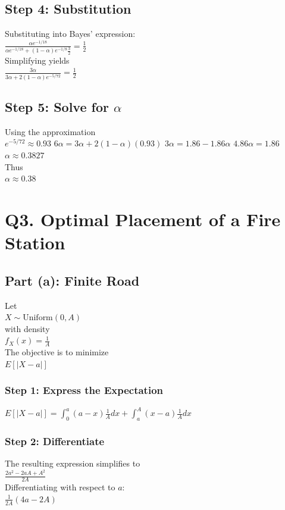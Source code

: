 \documentclass{article}
\begin{document}
\subsection{Step 4: Substitution}
Substituting into Bayes' expression: \\
$\frac{\alpha e^{-1/18}}{\alpha e^{-1/18}+(1-\alpha)e^{-1/8}\frac{3}{2}}=\frac{1}{2}$ \\
Simplifying yields \\
$\frac{3\alpha}{3\alpha+2(1-\alpha)e^{-5/72}}=\frac{1}{2}$

\subsection{Step 5: Solve for $\alpha$}
Using the approximation \\
$e^{-5/72} \approx 0.93$ \quad $6\alpha = 3\alpha + 2(1-\alpha)(0.93)$ \quad $3\alpha = 1.86 - 1.86\alpha$ \quad $4.86\alpha = 1.86$ \quad $\alpha \approx 0.3827$ \\
Thus \\
$\alpha \approx 0.38$

\section{Q3. Optimal Placement of a Fire Station}

\subsection{Part (a): Finite Road}
Let \\
$X \sim \text{Uniform}(0,A)$ \\
with density \\
$f_X(x)=\frac{1}{A}$ \\
The objective is to minimize \\
$E[|X-a|]$

\subsubsection{Step 1: Express the Expectation}
$E[|X-a|] = \int_0^a (a-x)\frac{1}{A}dx + \int_a^A (x-a)\frac{1}{A}dx$

\subsubsection{Step 2: Differentiate}
The resulting expression simplifies to \\
$\frac{2a^2 - 2aA + A^2}{2A}$ \\
Differentiating with respect to $a$: \\
$\frac{1}{2A}(4a-2A)$
\end{document}
